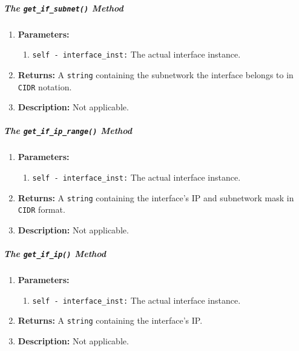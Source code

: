         \subparagraph{The \texttt{get\_if\_subnet()} Method}
            \begin{enumerate}
                \item \textbf{Parameters:}
                \begin{enumerate}
                    \item \texttt{self - interface\_inst:} The actual interface instance.
                \end{enumerate}
                \item \textbf{Returns:} A \texttt{string} containing the subnetwork the interface belongs to in \texttt{CIDR} notation.
                \item \textbf{Description:} Not applicable.
            \end{enumerate}

        \subparagraph{The \texttt{get\_if\_ip\_range()} Method}
            \begin{enumerate}
                \item \textbf{Parameters:}
                \begin{enumerate}
                    \item \texttt{self - interface\_inst:} The actual interface instance.
                \end{enumerate}
                \item \textbf{Returns:} A \texttt{string} containing the interface's IP and subnetwork mask in \texttt{CIDR} format.
                \item \textbf{Description:} Not applicable.
            \end{enumerate}

        \subparagraph{The \texttt{get\_if\_ip()} Method}
            \begin{enumerate}
                \item \textbf{Parameters:}
                \begin{enumerate}
                    \item \texttt{self - interface\_inst:} The actual interface instance.
                \end{enumerate}
                \item \textbf{Returns:} A \texttt{string} containing the interface's IP.
                \item \textbf{Description:} Not applicable.
            \end{enumerate}

